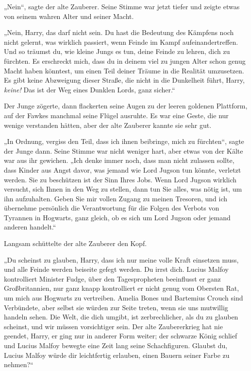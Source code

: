{„Nein“, sagte der alte Zauberer. Seine Stimme war jetzt tiefer und zeigte etwas von seinem wahren Alter und seiner Macht.

„Nein, Harry, das darf nicht sein. Du hast die Bedeutung des Kämpfens noch nicht gelernt, was wirklich passiert, wenn Feinde im Kampf aufeinandertreffen. Und so träumst du, wie kleine Jungs es tun, deine Feinde zu lehren, dich zu fürchten. Es erschreckt mich, dass du in deinem viel zu jungen Alter schon genug Macht haben könntest, um einen Teil deiner Träume in die Realität umzusetzen. Es gibt keine Abzweigung dieser Straße, die nicht in die Dunkelheit führt, Harry, \emph{keine!} Das ist der Weg eines Dunklen Lords, ganz sicher.“

Der Junge zögerte, dann flackerten seine Augen zu der leeren goldenen Plattform, auf der Fawkes manchmal seine Flügel ausruhte. Es war eine Geste, die nur wenige verstanden hätten, aber der alte Zauberer kannte sie sehr gut.

„In Ordnung, vergiss den Teil, dass ich ihnen beibringe, mich zu fürchten“, sagte der Junge dann. Seine Stimme war nicht weniger hart, aber etwas von der Kälte war aus ihr gewichen. „Ich denke immer noch, dass man nicht zulassen sollte, dass Kinder aus Angst davor, was jemand wie Lord Jugson tun könnte, verletzt werden. Sie zu beschützen ist der Sinn Ihres Jobs. Wenn Lord Jugson wirklich versucht, sich Ihnen in den Weg zu stellen, dann tun Sie alles, was nötig ist, um ihn aufzuhalten. Geben Sie mir vollen Zugang zu meinen Tresoren, und ich übernehme persönlich die Verantwortung für die Folgen des Verbots von Tyrannen in Hogwarts, ganz gleich, ob es sich um Lord Jugson oder jemand anderen handelt.“

Langsam schüttelte der alte Zauberer den Kopf.

„Du scheinst zu glauben, Harry, dass ich nur meine volle Kraft einsetzen muss, und alle Feinde werden beiseite gefegt werden. Du irrst dich. Lucius Malfoy kontrolliert Minister Fudge, über den Tagespropheten beeinflusst er ganz Großbritannien, nur ganz knapp kontrolliert er nicht genug vom Obersten Rat, um mich aus Hogwarts zu vertreiben. Amelia Bones und Bartemius Crouch sind Verbündete, aber selbst sie würden zur Seite treten, wenn sie uns mutwillig handeln sehen. Die Welt, die dich umgibt, ist zerbrechlicher, als du zu glauben scheinst, und wir müssen vorsichtiger sein. Der alte Zaubererkrieg hat nie geendet, Harry, er ging nur in anderer Form weiter; der schwarze König schlief und Lucius Malfoy bewegte eine Zeit lang seine Schachfiguren. Glaubst du, Lucius Malfoy würde dir leichtfertig erlauben, einen Bauern seiner Farbe zu nehmen?“

}
